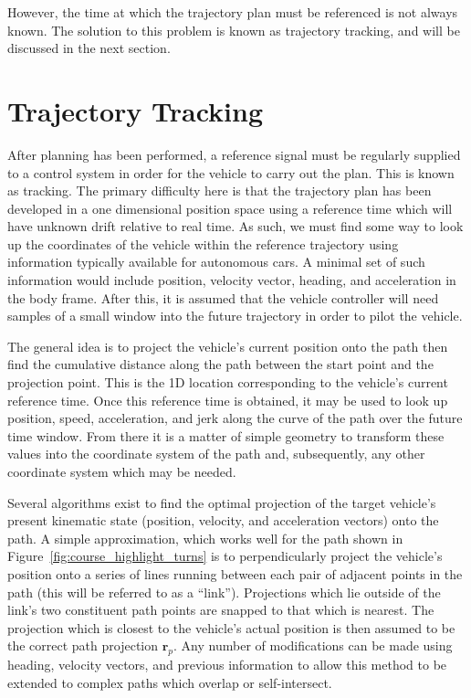 \documentclass[letterpaper, 10 pt, conference]{ieeeconf}  %
\begin{document}
However, the time at which the trajectory plan must be referenced is not always known.
The solution to this problem is known as trajectory tracking, and will be discussed in the next section.


\section{Trajectory Tracking} \label{sec:trajectorytracking}

After planning has been performed, a reference signal must be regularly supplied to a control system in order for the vehicle to carry out the plan.
This is known as tracking.
The primary difficulty here is that the trajectory plan has been developed in a one dimensional position space using a reference time which will have unknown drift relative to real time.
As such, we must find some way to look up the coordinates of the vehicle within the reference trajectory using information typically available for autonomous cars.
A minimal set of such information would include position, velocity vector, heading, and acceleration in the body frame.
After this, it is assumed that the vehicle controller will need samples of a small window into the future trajectory in order to pilot the vehicle.

The general idea is to project the vehicle's current position onto the path then find the cumulative distance along the path between the start point and the projection point.
This is the 1D location corresponding to the vehicle's current reference time.
Once this reference time is obtained, it may be used to look up position, speed, acceleration, and jerk along the curve of the path over the future time window.
From there it is a matter of simple geometry to transform these values into the coordinate system of the path and, subsequently, any other coordinate system which may be needed.


Several algorithms exist to find the optimal projection of the target vehicle's present kinematic state (position, velocity, and acceleration vectors) onto the path.
A simple approximation, which works well for the path shown in Figure~\ref{fig:course_highlight_turns} is to perpendicularly project the vehicle's position onto a series of lines running between each pair of adjacent points in the path (this will be referred to as a ``link'').
Projections which lie outside of the link's two constituent path points are snapped to that which is nearest.
The projection which is closest to the vehicle's actual position is then assumed to be the correct path projection $\mathbf{r}_p$.
Any number of modifications can be made using heading, velocity vectors, and previous information to allow this method to be extended to complex paths which overlap or self-intersect.
\end{document}
